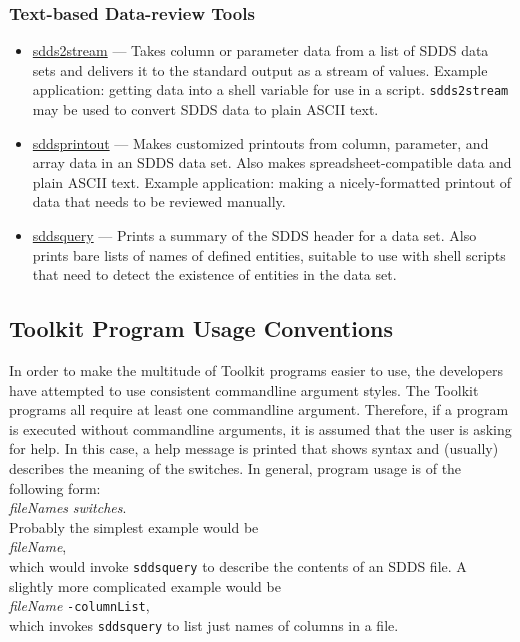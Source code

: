 \documentclass[11pt]{article}
\newcommand{\progref}[1]{\hyperref[#1]{#1}}
\begin{document}
\subsubsection{Text-based Data-review Tools}

\begin{itemize}
\item \progref{sdds2stream} --- Takes column or parameter data from a list of SDDS data sets and delivers it to
the standard output as a stream of values.  Example application: getting data into a shell variable for use in a
script.  \verb|sdds2stream| may be used to convert SDDS data to plain ASCII text.

\item \progref{sddsprintout} --- Makes customized printouts from
column, parameter, and array data in an SDDS data set.  Also makes
spreadsheet-compatible data and plain ASCII text.  Example
application: making a nicely-formatted printout of data that needs to
be reviewed manually.

\item \progref{sddsquery} --- Prints a summary of the SDDS header for a data set.  Also prints bare lists of names
of defined entities, suitable to use with shell scripts that need to detect the existence of entities in the data
set.

\end{itemize}


\subsection{Toolkit Program Usage Conventions}

In order to make the multitude of Toolkit programs easier to use, the developers have attempted to use consistent
commandline argument styles.  The Toolkit programs all require at least one commandline argument.  Therefore, if a
program is executed without commandline arguments, it is assumed that the user is asking for help.  In this case, a
help message is printed that shows syntax and (usually) describes the meaning of the switches.  In general, program
usage is of the following form:\\
\hspace*{5mm}{\tt programName} {\em fileNames} {\em switches}.\\
Probably the simplest example would be \\ 
\hspace*{5mm}{\tt sddsquery } {\em fileName},\\
which would invoke {\tt sddsquery} to describe the contents of an SDDS file.
A slightly more complicated example would be\\
\hspace*{5mm}{\tt sddsquery } {\em fileName} {\tt -columnList},\\
which invokes {\tt sddsquery} to list just names of columns in a file.
\end{document}
